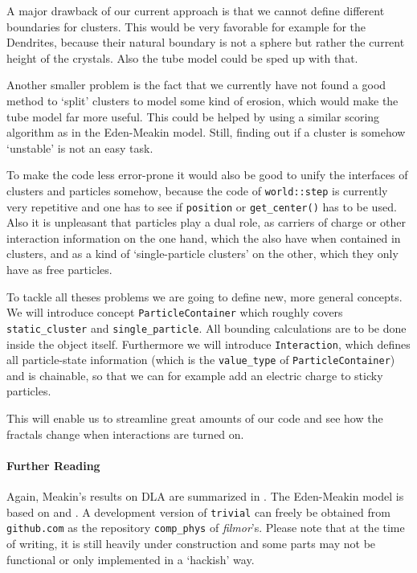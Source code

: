\documentclass[twocolumn, 10pt]{scrartcl}
\begin{document}
            A major drawback of our current approach is that we cannot define different boundaries for clusters. This
            would be very favorable for example for the Dendrites, because their natural boundary is not a sphere but
            rather the current height of the crystals. Also the tube model could be sped up with that.

            Another smaller problem is the fact that we currently have not found a good method to `split' clusters to
            model some kind of erosion, which would make the tube model far more useful. This could be helped by using a
            similar scoring algorithm as in the Eden-Meakin model. Still, finding out if a cluster is somehow `unstable'
            is not an easy task.

            To make the code less error-prone it would also be good to unify the interfaces of clusters and particles
            somehow, because the code of \lstinline'world::step' is currently very repetitive and one has to see if
            \lstinline'position' or \lstinline'get_center()' has to be used. Also it is unpleasant that particles play
            a dual role, as carriers of charge or other interaction information on the one hand, which the also have
            when contained in clusters, and as a kind of `single-particle clusters' on the other, which they only
            have as free particles.

            To tackle all theses problems we are going to define new, more general concepts. We will introduce concept
            \lstinline'ParticleContainer' which roughly covers \lstinline'static_cluster' and
            \lstinline'single_particle'. All bounding calculations are to be done inside the object itself. Furthermore
            we will introduce \mbox{\lstinline'Interaction',} which defines all particle-state information (which is the
            \lstinline'value_type' of \lstinline'ParticleContainer') and is chainable, so that we can for example add
            an electric charge to sticky particles.

            This will enable us to streamline great amounts of our code and see how the fractals change when
            interactions are turned on.

        {\small
            \paragraph{Further Reading}
            Again, Meakin's results on DLA are summarized in \cite{src-meakin1}. The Eden-Meakin model is based
            on \cite{src-eden} and \cite{src-meakin-eden}.
            A development version of \texttt{trivial} can freely be obtained from \texttt{github.com} as the
            repository \texttt{comp\_phys} of \emph{filmor}'s. Please note that at the time of writing, it is still
            heavily under construction and some parts may not be functional or only implemented in a `hackish' way.
        }            
\end{document}
